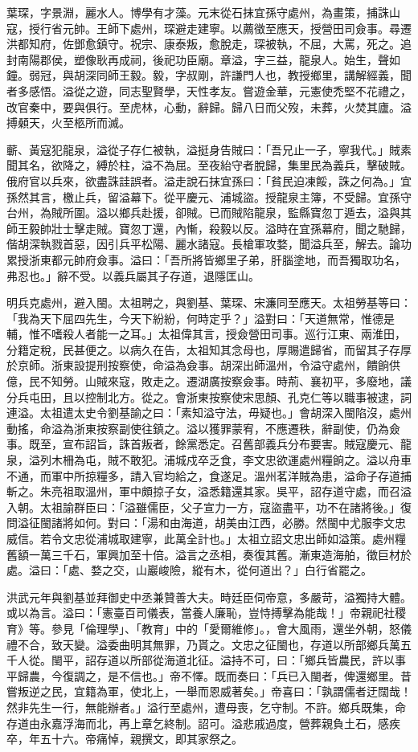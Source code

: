 \begin{pinyinscope}
葉琛，字景淵，麗水人。博學有才藻。元末從石抹宜孫守處州，為畫策，捕誅山寇，授行省元帥。王師下處州，琛避走建寧。以薦徵至應天，授營田司僉事。尋遷洪都知府，佐鄧愈鎮守。祝宗、康泰叛，愈脫走，琛被執，不屈，大罵，死之。追封南陽郡侯，塑像耿再成祠，後祀功臣廟。章溢，字三益，龍泉人。始生，聲如鐘。弱冠，與胡深同師王毅。毅，字叔剛，許謙門人也，教授鄉里，講解經義，聞者多感悟。溢從之遊，同志聖賢學，天性孝友。嘗遊金華，元憲使禿堅不花禮之，改官秦中，要與俱行。至虎林，心動，辭歸。歸八日而父歿，未葬，火焚其廬。溢搏顙天，火至柩所而滅。

蘄、黃寇犯龍泉，溢從子存仁被執，溢挺身告賊曰：「吾兄止一子，寧我代。」賊素聞其名，欲降之，縛於柱，溢不為屈。至夜紿守者脫歸，集里民為義兵，擊破賊。俄府官以兵來，欲盡誅詿誤者。溢走說石抹宜孫曰：「貧民迫凍餒，誅之何為。」宜孫然其言，檄止兵，留溢幕下。從平慶元、浦城盜。授龍泉主簿，不受歸。宜孫守台州，為賊所圍。溢以鄉兵赴援，卻賊。已而賊陷龍泉，監縣寶忽丁遁去，溢與其師王毅帥壯士擊走賊。寶忽丁還，內慚，殺毅以反。溢時在宜孫幕府，聞之馳歸，偕胡深執戮首惡，因引兵平松陽、麗水諸寇。長槍軍攻婺，聞溢兵至，解去。論功累授浙東都元帥府僉事。溢曰：「吾所將皆鄉里子弟，肝腦塗地，而吾獨取功名，弗忍也。」辭不受。以義兵屬其子存道，退隱匡山。

明兵克處州，避入閩。太祖聘之，與劉基、葉琛、宋濂同至應天。太祖勞基等曰：「我為天下屈四先生，今天下紛紛，何時定乎？」溢對曰：「天道無常，惟德是輔，惟不嗜殺人者能一之耳。」太祖偉其言，授僉營田司事。巡行江東、兩淮田，分籍定稅，民甚便之。以病久在告，太祖知其念母也，厚賜遣歸省，而留其子存厚於京師。浙東設提刑按察使，命溢為僉事。胡深出師溫州，令溢守處州，饋餉供億，民不知勞。山賊來寇，敗走之。遷湖廣按察僉事。時荊、襄初平，多廢地，議分兵屯田，且以控制北方。從之。會浙東按察使宋思顏、孔克仁等以職事被逮，詞連溢。太祖遣太史令劉基諭之曰：「素知溢守法，毋疑也。」會胡深入閩陷沒，處州動搖，命溢為浙東按察副使往鎮之。溢以獲罪蒙宥，不應遷秩，辭副使，仍為僉事。既至，宣布詔旨，誅首叛者，餘黨悉定。召舊部義兵分布要害。賊寇慶元、龍泉，溢列木柵為屯，賊不敢犯。浦城戍卒乏食，李文忠欲運處州糧餉之。溢以舟車不通，而軍中所掠糧多，請入官均給之，食遂足。溫州茗洋賊為患，溢命子存道捕斬之。朱亮祖取溫州，軍中頗掠子女，溢悉籍還其家。吳平，詔存道守處，而召溢入朝。太祖諭群臣曰：「溢雖儒臣，父子宣力一方，寇盜盡平，功不在諸將後。」復問溢征閩諸將如何。對曰：「湯和由海道，胡美由江西，必勝。然閩中尤服李文忠威信。若令文忠從浦城取建寧，此萬全計也。」太祖立詔文忠出師如溢策。處州糧舊額一萬三千石，軍興加至十倍。溢言之丞相，奏復其舊。漸東造海舶，徵巨材於處。溢曰：「處、婺之交，山巖峻險，縱有木，從何道出？」白行省罷之。

洪武元年與劉基並拜御史中丞兼贊善大夫。時廷臣伺帝意，多嚴苛，溢獨持大體。或以為言。溢曰：「憲臺百司儀表，當養人廉恥，豈恃搏擊為能哉！」帝親祀社稷育》等。參見「倫理學」、「教育」中的「愛爾維修」。，會大風雨，還坐外朝，怒儀禮不合，致天變。溢委曲明其無罪，乃貰之。文忠之征閩也，存道以所部鄉兵萬五千人從。閩平，詔存道以所部從海道北征。溢持不可，曰：「鄉兵皆農民，許以事平歸農，今復調之，是不信也。」帝不懌。既而奏曰：「兵已入閩者，俾還鄉里。昔嘗叛逆之民，宜籍為軍，使北上，一舉而恩威著矣。」帝喜曰：「孰謂儒者迂闊哉！然非先生一行，無能辦者。」溢行至處州，遭母喪，乞守制。不許。鄉兵既集，命存道由永嘉浮海而北，再上章乞終制。詔可。溢悲戚過度，營葬親負土石，感疾卒，年五十六。帝痛悼，親撰文，即其家祭之。


\end{pinyinscope}
